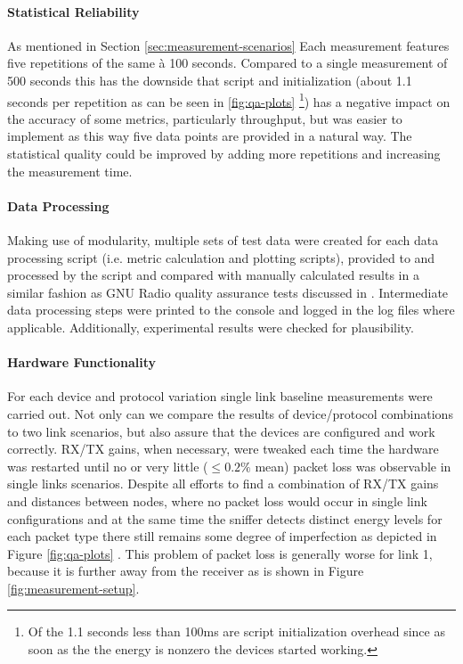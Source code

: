 \paragraph{Statistical Reliability}
As mentioned in Section \ref{sec:measurement-scenarios} Each measurement features five repetitions of the same à 100 seconds. Compared to a single measurement of 500 seconds this has the downside that script and  initialization (about 1.1 seconds per repetition as can be seen in \ref{fig:qa-plots} \footnote{Of the 1.1 seconds less than 100ms are script initialization overhead since as soon as the the energy is nonzero the devices started working.}) has a negative impact on the accuracy of some metrics, particularly throughput, but was easier to implement as this way five data points are provided in a natural way. The statistical quality could be improved by adding more repetitions and increasing the measurement time. 

\paragraph{Data Processing}
Making use of modularity, multiple sets of test data were created for each data processing script (i.e. metric calculation and plotting scripts), provided to and processed by the script and compared with manually calculated results in a similar fashion as GNU Radio quality assurance tests discussed in \cite{gr-python-tut}. Intermediate data processing steps were printed to the console and logged in the log files where applicable. Additionally, experimental results were checked for plausibility. 

\paragraph{Hardware Functionality}
For each device and protocol variation single link baseline measurements were carried out. Not only can we compare the results of device/protocol combinations to two link scenarios, but also assure that the devices are configured and work correctly. RX/TX gains, when necessary, were tweaked each time the hardware was restarted until no or very little ($\le0.2\%$ mean) packet loss was observable in single links scenarios.
Despite all efforts to find a combination of RX/TX gains and distances between nodes, where no packet loss would occur in single link configurations and at the same time the sniffer detects distinct energy levels for each packet type there still remains some degree of imperfection as depicted in Figure \ref{fig:qa-plots} . This problem of packet loss is generally worse for link 1, because it is further away from the receiver as is shown in Figure \ref{fig:measurement-setup}.  

